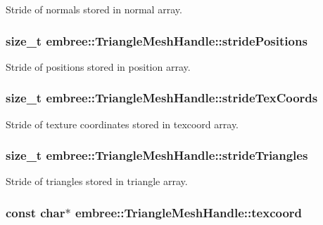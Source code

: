 Stride of normals stored in normal array. 

\hypertarget{classembree_1_1_triangle_mesh_handle_a9e2c086b3028155438d81dad7deab2c8}{
\subsubsection[{stridePositions}]{\setlength{\rightskip}{0pt plus 5cm}size\_\-t {\bf embree::TriangleMeshHandle::stridePositions}}}
\label{classembree_1_1_triangle_mesh_handle_a9e2c086b3028155438d81dad7deab2c8}


Stride of positions stored in position array. 

\hypertarget{classembree_1_1_triangle_mesh_handle_a49aff40aa876ddc6474b257314cae841}{
\subsubsection[{strideTexCoords}]{\setlength{\rightskip}{0pt plus 5cm}size\_\-t {\bf embree::TriangleMeshHandle::strideTexCoords}}}
\label{classembree_1_1_triangle_mesh_handle_a49aff40aa876ddc6474b257314cae841}


Stride of texture coordinates stored in texcoord array. 

\hypertarget{classembree_1_1_triangle_mesh_handle_ada71ff7f9d327215154981aa74506059}{
\subsubsection[{strideTriangles}]{\setlength{\rightskip}{0pt plus 5cm}size\_\-t {\bf embree::TriangleMeshHandle::strideTriangles}}}
\label{classembree_1_1_triangle_mesh_handle_ada71ff7f9d327215154981aa74506059}


Stride of triangles stored in triangle array. 

\hypertarget{classembree_1_1_triangle_mesh_handle_ae7c3847e8558019d88ed1bf236d1589c}{
\subsubsection[{texcoord}]{\setlength{\rightskip}{0pt plus 5cm}const char$\ast$ {\bf embree::TriangleMeshHandle::texcoord}}}
\label{classembree_1_1_triangle_mesh_handle_ae7c3847e8558019d88ed1bf236d1589c}


